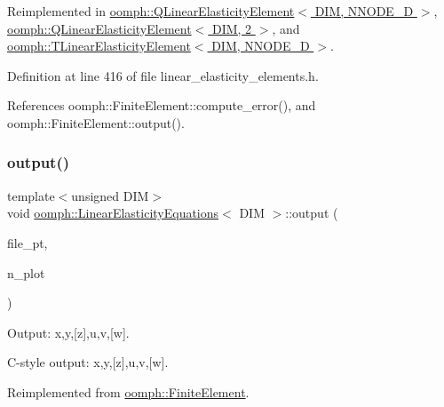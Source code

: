 Reimplemented in \hyperlink{classoomph_1_1QLinearElasticityElement_a16db5e5ba60abbb8b79e1fce0ebd892e}{oomph\+::\+Q\+Linear\+Elasticity\+Element$<$ D\+I\+M, N\+N\+O\+D\+E\+\_\+D $>$}, \hyperlink{classoomph_1_1QLinearElasticityElement_a16db5e5ba60abbb8b79e1fce0ebd892e}{oomph\+::\+Q\+Linear\+Elasticity\+Element$<$ D\+I\+M, 2 $>$}, and \hyperlink{classoomph_1_1TLinearElasticityElement_adc8c188c039e833bfab31aa3b127b3f7}{oomph\+::\+T\+Linear\+Elasticity\+Element$<$ D\+I\+M, N\+N\+O\+D\+E\+\_\+D $>$}.



Definition at line 416 of file linear\+\_\+elasticity\+\_\+elements.\+h.



References oomph\+::\+Finite\+Element\+::compute\+\_\+error(), and oomph\+::\+Finite\+Element\+::output().

\mbox{\label{classoomph_1_1LinearElasticityEquations_ae48d7ecffb8e3c914a51947b5f79466c}} 
\subsubsection{\texorpdfstring{output()}{output()}\hspace{0.1cm}{\footnotesize\ttfamily [4/4]}}
{\footnotesize\ttfamily template$<$unsigned D\+IM$>$ \\
void \hyperlink{classoomph_1_1LinearElasticityEquations}{oomph\+::\+Linear\+Elasticity\+Equations}$<$ D\+IM $>$\+::output (\begin{DoxyParamCaption}\item[{F\+I\+LE $\ast$}]{file\+\_\+pt,  }\item[{const unsigned \&}]{n\+\_\+plot }\end{DoxyParamCaption})\hspace{0.3cm}{\ttfamily [virtual]}}



Output\+: x,y,\mbox{[}z\mbox{]},u,v,\mbox{[}w\mbox{]}. 

C-\/style output\+: x,y,\mbox{[}z\mbox{]},u,v,\mbox{[}w\mbox{]}. 

Reimplemented from \hyperlink{classoomph_1_1FiniteElement_adfaee690bb0608f03320eeb9d110d48c}{oomph\+::\+Finite\+Element}.



